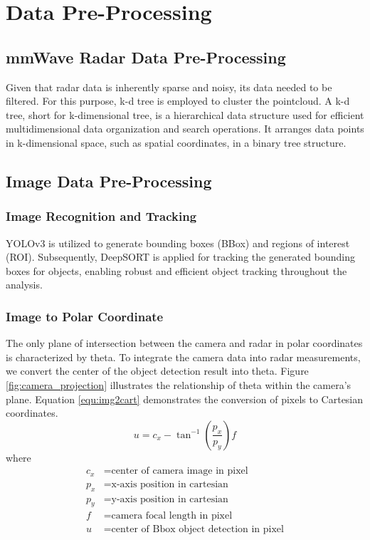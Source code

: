 \section{Data Pre-Processing}\label{sec:2-preprocessing}
\subsection{mmWave Radar Data Pre-Processing}\label{sec:2-kd_tree}
Given that radar data is inherently sparse and noisy, its data needed to be filtered.
For this purpose, k-d tree is employed to cluster the pointcloud.
A k-d tree, short for k-dimensional tree, is a hierarchical data structure used for efficient multidimensional data organization and search operations. 
It arranges data points in k-dimensional space, such as spatial coordinates, in a binary tree structure. \cite{praveen_palanisamy_2019_3559187}

\subsection{Image Data Pre-Processing}\label{sec:2-img_recognition}
\subsubsection{Image Recognition and Tracking}
YOLOv3 is utilized to generate bounding boxes (BBox) and regions of interest (ROI)\cite{redmon2018yolov3}.
Subsequently, DeepSORT is applied for tracking the generated bounding boxes for objects, 
enabling robust and efficient object tracking throughout the analysis\cite{Wojke2017simple}.

\subsubsection{Image to Polar Coordinate}
The only plane of intersection between the camera and radar in polar coordinates is characterized by theta. 
To integrate the camera data into radar measurements, 
we convert the center of the object detection result into theta. 
Figure \ref{fig:camera_projection} illustrates the relationship of theta within the camera's plane. 
Equation \ref{equ:img2cart} demonstrates the conversion of pixels to Cartesian coordinates.
\begin{equation}\label{equ:img2cart}
u=c_x-\tan^{-1}(\frac{p_x}{p_y})f
\end{equation}
where
\begin{align*}
    c_x &=\text{center of camera image in pixel}\\
    p_x &=\text{x-axis position in cartesian}\\
    p_y &=\text{y-axis position in cartesian}\\
    f &=\text{camera focal length in pixel}\\
    u &=\text{center of Bbox object detection in pixel}
\end{align*}

